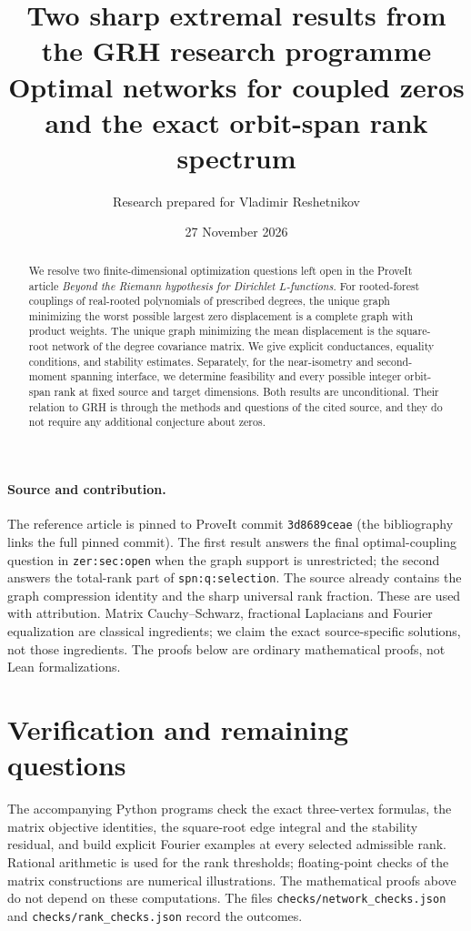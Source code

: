 \documentclass[11pt]{article}
\title{Two sharp extremal results from the GRH research programme\\[3pt]
\large Optimal networks for coupled zeros and the exact orbit-span rank spectrum}
\author{Research prepared for Vladimir Reshetnikov}
\date{27 November 2026}
\theoremstyle{remark}
\begin{document}
\maketitle
\begin{abstract}
We resolve two finite-dimensional optimization questions left open in the
ProveIt article \emph{Beyond the Riemann hypothesis for Dirichlet
$L$-functions}. For rooted-forest couplings of real-rooted polynomials of
prescribed degrees, the unique graph minimizing the worst possible largest
zero displacement is a complete graph with product weights. The unique
graph minimizing the mean displacement is the square-root network of the
degree covariance matrix. We give explicit conductances, equality
conditions, and stability estimates. Separately, for the near-isometry
and second-moment spanning interface, we determine feasibility and every
possible integer orbit-span rank at fixed source and target dimensions.
Both results are unconditional. Their relation to GRH is through the
methods and questions of the cited source, and they do not require any
additional conjecture about zeros.
\end{abstract}

\paragraph{Source and contribution.}
The reference article is pinned to ProveIt commit
\texttt{3d8689ceae} (the bibliography links the full pinned commit).
The first result answers the final optimal-coupling question in
\texttt{zer:sec:open} when the graph support is unrestricted; the second
answers the total-rank part of \texttt{spn:q:selection}. The source already
contains the graph compression identity and the sharp universal rank
fraction. These are used with attribution. Matrix Cauchy--Schwarz,
fractional Laplacians and Fourier equalization are classical ingredients;
we claim the exact source-specific solutions, not those ingredients.
The proofs below are ordinary mathematical proofs, not Lean formalizations.

\tableofcontents
\bigskip



\section{Verification and remaining questions}

The accompanying Python programs check the exact three-vertex formulas,
the matrix objective identities, the square-root edge integral and the
stability residual, and build explicit Fourier examples at every selected
admissible rank. Rational arithmetic is used for the rank thresholds;
floating-point checks of the matrix constructions are numerical
illustrations. The mathematical proofs above do not depend on these
computations. The files \texttt{checks/network\_checks.json} and
\texttt{checks/rank\_checks.json} record the outcomes.
\end{document}
